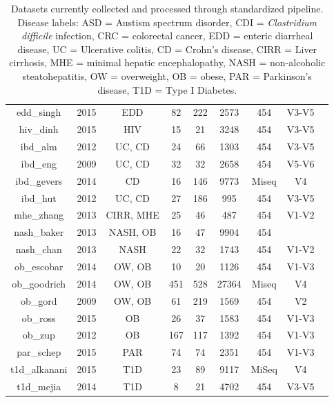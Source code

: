 \documentclass[12pt]{article}
\begin{document}
{\begin{table}[h]
{\begin{tabular}{|c|c|c|c|c|c|c|c|c|}
	edd\_singh & 2015 & EDD & 82 & 222 & 2573 & 454 & V3-V5 & \cite{edd-singh}\\ 
	hiv\_dinh & 2015 & HIV & 15 & 21 & 3248 & 454 & V3-V5 & \cite{hiv-dinh}\\ 
	ibd\_alm & 2012 & UC, CD & 24 & 66 & 1303 & 454 & V3-V5 & \cite{ibd-papa}\\ 
	ibd\_eng & 2009 & UC, CD & 32 & 32 & 2658 & 454 & V5-V6 & \cite{ibd-engstrand}\\ 
	ibd\_gevers & 2014 & CD & 16 & 146 & 9773 & Miseq & V4 & \cite{ibd-gevers}\\ 
	ibd\_hut & 2012 & UC, CD & 27 & 186 & 995 & 454 & V3-V5 & \cite{ibd_hut}\\ 
	mhe\_zhang & 2013 & CIRR, MHE & 25 & 46 & 487 & 454 & V1-V2 & \cite{mhe_zhang}\\ 
	nash\_baker & 2013 & NASH, OB & 16 & 47 & 9904 & 454 &   & \cite{nash-baker}\\ 
	nash\_chan & 2013 & NASH & 22 & 32 & 1743 & 454 & V1-V2 & \cite{nash-chan}\\ 
	ob\_escobar & 2014 & OW, OB & 10 & 20 & 1126 & 454 & V1-V3 & \cite{ob-escobar}\\ 
	ob\_goodrich & 2014 & OW, OB & 451 & 528 & 27364 & Miseq & V4 & \cite{ob-goodrich}\\ 
	ob\_gord & 2009 & OW, OB & 61 & 219 & 1569 & 454 & V2 & \cite{ob-gordon}\\ 
	ob\_ross & 2015 & OB & 26 & 37 & 1583 & 454 & V1-V3 & \cite{ob-ross}\\ 
	ob\_zup & 2012 & OB & 167 & 117 & 1392 & 454 & V1-V3 & \cite{ob-zupancic}\\ 
	par\_schep & 2015 & PAR & 74 & 74 & 2351 & 454 & V1-V3 & \cite{par-schep}\\ 
	t1d\_alkanani & 2015 & T1D & 23 & 89 & 9117 & MiSeq & V4 & \cite{t1d_alkanani}\\ 
	t1d\_mejia & 2014 & T1D & 8 & 21 & 4702 & 454 & V3-V5 & \cite{t1d_mejia}\\ 	
	\hline
\end{tabular}}
\caption{Datasets currently collected and processed through standardized pipeline. Disease labels: ASD = Austism spectrum disorder, CDI = \textit{Clostridium difficile} infection, CRC = colorectal cancer, EDD = enteric diarrheal disease, UC = Ulcerative colitis, CD = Crohn's disease, CIRR = Liver cirrhosis, MHE =  minimal hepatic encephalopathy, NASH = non-alcoholic steatohepatitis, OW = overweight, OB = obese, PAR = Parkinson's disease, T1D = Type I Diabetes. }\label{tab:datasets}
\end{table}
}
\end{document}
